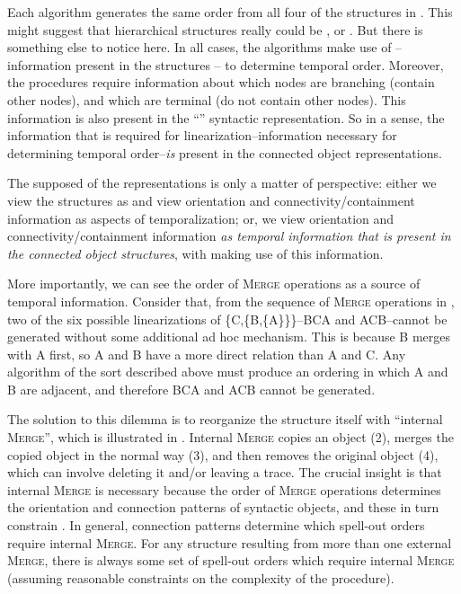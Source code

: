   Each algorithm generates the same order from all four of the structures in {}. This might suggest that hierarchical structures really could be , or . But there is something else to notice here. In all cases, the  algorithms make use of  -- information present in the structures -- to determine temporal order. Moreover, the procedures require information about which nodes are branching (contain other nodes), and which are terminal (do not contain other nodes). This information is also present in the “” syntactic representation. So in a sense, the information that is required for linearization--information necessary for determining temporal order--\textit{is} present in the connected object representations. 

  The supposed  of the representations is only a matter of perspective: either we view the structures as  and view orientation and connectivity/containment information as aspects of temporalization; or, we view orientation and connectivity/containment information \textit{as temporal information that is present in the connected object structures}, with  making use of this information. 

  More importantly, we can see the order of \textsc{Merge} operations as a source of temporal information. Consider that, from the sequence of \textsc{Merge} operations in {}, two of the six possible linearizations of \{C,\{B,\{A\}\}\}--BCA and ACB--cannot be generated without some additional ad hoc mechanism. This is because B merges with A first, so A and B have a more direct relation than A and C. Any  algorithm of the sort described above must produce an ordering in which A and B are adjacent, and therefore BCA and ACB cannot be generated.

  The solution to this dilemma is to reorganize the structure itself with “internal \textsc{Merge}”, which is illustrated in {}. Internal \textsc{Merge} copies an object (2), merges the copied object in the normal way (3), and then removes the original object (4), which can involve deleting it and/or leaving a trace. The crucial insight is that internal \textsc{Merge} is necessary because the order of \textsc{Merge} operations determines the orientation and connection patterns of syntactic objects, and these in turn constrain . In general, connection patterns determine which spell-out orders require internal \textsc{Merge}. For any structure resulting from more than one external \textsc{Merge}, there is always some set of spell-out orders which require internal \textsc{Merge} (assuming reasonable constraints on the complexity of the  procedure).

